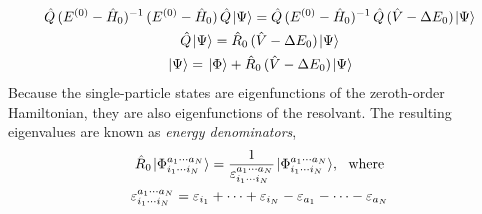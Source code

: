 \documentclass[thesis.tex]{subfiles}
\begin{document}
\begin{gather} \label{eq:MBPT_Q}
  \hat{Q}\mathop{(E^{(0)} - \hat{H}\hspace{-1pt}_{0})^{-1}}\mathop{(E^{(0)} - \hat{H}\hspace{-1pt}_{0})}\hat{Q}\hspace{1pt}\lvert \Psi \rangle = \hat{Q}\mathop{(E^{(0)} - \hat{H}\hspace{-1pt}_{0})^{-1}}\hat{Q}\mathop{(\hat{V} - \Delta E_{0})}\hspace{1pt}\lvert \Psi \rangle \notag \\
  \hat{Q}\hspace{1pt}\lvert \Psi \rangle = \hat{R}_{0}\mathop{(\hat{V} - \Delta E_{0})}\hspace{1pt}\lvert \Psi \rangle \notag \\
  \hspace{1pt}\lvert \Psi \rangle = \hspace{1pt}\lvert \Phi \rangle + \hat{R}_{0}\mathop{(\hat{V} - \Delta E_{0})}\hspace{1pt}\lvert \Psi \rangle
\end{gather}
Because the single-particle states are eigenfunctions of the zeroth-order Hamiltonian, they are also eigenfunctions of the resolvant.  The resulting eigenvalues are known as \textit{energy denominators},
\begin{gather} \label{eq:energy_denominators}
  \hat{R}_{0}\hspace{1pt}\lvert \Phi^{a_{1}\cdots a_{N}}_{i_{1}\cdots i_{N}} \rangle = \frac{1}{\varepsilon^{a_{1}\cdots a_{N}}_{i_{1}\cdots i_{N}}}\hspace{1pt}\lvert \Phi^{a_{1}\cdots a_{N}}_{i_{1}\cdots i_{N}} \rangle,\ \ \text{where} \notag \\
  \varepsilon^{a_{1}\cdots a_{N}}_{i_{1}\cdots i_{N}} = \varepsilon_{i_{1}} + \cdots + \varepsilon_{i_{N}} - \varepsilon_{a_{1}} - \cdots - \varepsilon_{a_{N}}
\end{gather}
\end{document}
